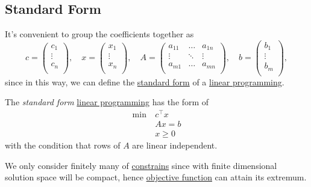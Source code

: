 \subsection{Standard Form}
It's convenient to group the coefficients together as
\[
	c= \begin{pmatrix}
		c_1    \\
		\vdots \\
		c_n    \\
	\end{pmatrix},\quad
	x = \begin{pmatrix}
		x_1    \\
		\vdots \\
		x_n    \\
	\end{pmatrix}, \quad
	A = \begin{pmatrix}
		a_{11} & \ldots & a_{1n} \\
		\vdots & \ddots & \vdots \\
		a_{m1} & \ldots & a_{mn} \\
	\end{pmatrix},\quad
	b = \begin{pmatrix}
		b_1    \\
		\vdots \\
		b_m    \\
	\end{pmatrix},
\]
since in this way, we can define the \hyperref[def:standard-form]{standard form} of a \hyperref[def:general-linear-programming-problem]{linear programming}.

\begin{definition}\label{def:standard-form}
	The \emph{standard form} \hyperref[def:general-linear-programming-problem]{linear programming} has the form of
	\[
		\begin{aligned}
			\min~ & c^{\top}x \\
			      & Ax = b    \\
			      & x\geq 0
		\end{aligned}
	\]
	with the condition that rows of \(A\) are linear independent.
\end{definition}

\begin{remark}
	We only consider finitely many of \hyperref[def:constraint]{constrains} since with finite dimensional solution space will be compact, hence \hyperref[def:objective-function]{objective function} can attain its extremum.
\end{remark}

